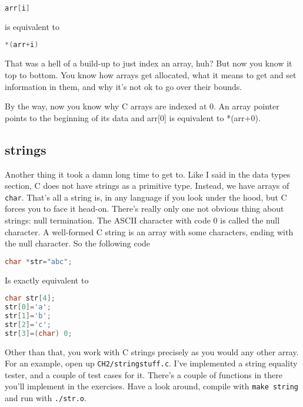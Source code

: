 \documentclass[ebook,11pt,oneside,openany]{memoir}
\begin{document}
\begin{lstlisting}[language=C]
arr[i]
\end{lstlisting}

is equivalent to

\begin{lstlisting}[language=C]
*(arr+i)
\end{lstlisting}

That was a hell of a build-up to just index an array, huh? But now you know it top to bottom. You know how arrays get allocated, what it means to get and set information in them, and why it's not ok to go over their bounds.

By the way, now you know why C arrays are indexed at 0. An array pointer points to the beginning of its data and arr[0] is equivalent to *(arr+0).

\subsection{strings}

Another thing it took a damn long time to get to. Like I said in the data types section, C does not have strings as a primitive type. Instead, we have arrays of \texttt{char}. That's all a string is, in any language if you look under the hood, but C forces you to face it head-on. There's really only one not obvious thing about strings: null termination. The ASCII character with code 0 is called the null character. A well-formed C string is an array with some characters, ending with the null character. So the following code

\begin{lstlisting}[language=C]
char *str="abc";
\end{lstlisting}

\noindent
Is exactly equivalent to 

\begin{lstlisting}[language=C]
char str[4];
str[0]='a';
str[1]='b';
str[2]='c';
str[3]=(char) 0;
\end{lstlisting}

Other than that, you work with C strings precisely as you would any other array. For an example, open up \texttt{CH2/stringstuff.c}. I've implemented a string equality tester, and a couple of test cases for it. There's a couple of functions in there you'll implement in the exercises. Have a look around, compile with \texttt{make string} and run with \texttt{./str.o}.
\end{document}
